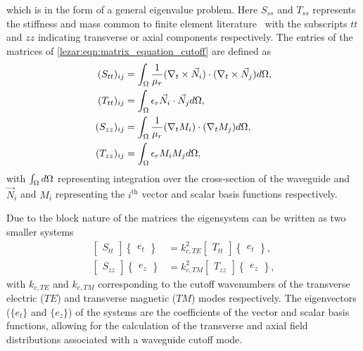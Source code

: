 which is in the form of a general eigenvalue problem.  Here $S_{ss}$ and $T_{ss}$ represents the stiffness and
mass common to finite element literature~\cite{Davidson2005, Jin2002} with
the subscripts ${tt}$ and ${zz}$ indicating transverse or axial
components respectively.  The entries of the matrices of
\eqref{lezar:eqn:matrix_equation_cutoff} are defined as
\begin{align}
\label{lezar:eqn:s_tt_ij}
(S_{tt})_{ij} &= \int_{\Omega}{\frac{1}{\mu_r}(\nabla_t\times{\vec{N}_i})\cdot(\nabla_t\times{\vec{N}_j})}{d\Omega},\\
\label{lezar:eqn:t_tt_ij}
(T_{tt})_{ij} &= \int_{\Omega}{\epsilon_r\vec{N}_i\cdot\vec{N}_j}{d\Omega},\\
\label{lezar:eqn:s_zz_ij}
(S_{zz})_{ij} &= \int_{\Omega}{\frac{1}{\mu_r}(\nabla_t{M_i})\cdot(\nabla_t{M_j})}{d\Omega},\\
\label{lezar:eqn:t_zz_ij}
(T_{zz})_{ij} &= \int_{\Omega}{\epsilon_r M_i M_j}{d\Omega},
\end{align}
with $\int_{\Omega}{}{d\Omega}$ representing integration over the
cross-section of the waveguide and $\vec{N}_i$ and $M_i$
representing the $i^{\text{th}}$ vector and scalar basis functions
respectively.

Due to the block nature of the matrices the eigensystem can be written
as two smaller systems
\begin{align}
    \begin{bmatrix}S_{tt}\end{bmatrix}\begin{Bmatrix}e_t\end{Bmatrix} &=
    k_{c,TE}^{2}\begin{bmatrix}
    T_{tt}\end{bmatrix}\begin{Bmatrix}e_t\end{Bmatrix},\\
    \begin{bmatrix}S_{zz}\end{bmatrix}\begin{Bmatrix}e_z\end{Bmatrix} &= k_{c,TM}^{2}\begin{bmatrix}T_{zz}\end{bmatrix}\begin{Bmatrix}e_z\end{Bmatrix},
\end{align}
with $k_{c,TE}$ and $k_{c,TM}$ corresponding to the cutoff
wavenumbers of the transverse electric ($TE$)
and transverse magnetic ($TM$) modes respectively. The eigenvectors
($\{e_t\}$ and $\{e_z\}$) of the systems are the coefficients of the
vector and scalar basis functions, allowing for the calculation of the
transverse and axial field distributions associated with a waveguide
cutoff mode.

